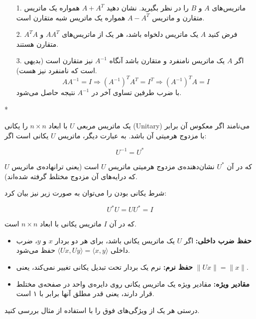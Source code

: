 \begin{example}
	\begin{itemize}
		\item [1. ] 
		ماتریس‌های 
		$A$
		و 
		$B$
		را در نظر بگیرید. نشان دهید 
		$A+A^T$
		همواره یک ماتریس متقارن و ماتریس
			$A-A^T$
		همواره یک ماتریس شبه متقارن است.
		\item[2. ] 
		 فرض کنید 
		 $A$
		 یک ماتریس دلخواه باشد، هر یک از ماتریس‌های 
		 $AA^T$
		 و
		 $A^TA$
		 متقارن هستند.
		 \item [3. ]
		  اگر 
		  $A$
		  یک ماتریس نامنفرد و متقارن باشد آنگاه
		 $A^{-1}$
		  نیز متقارن است (بدیهی است که نامنفرد نیز هست).
		  \[ AA^{-1}=I \Longrightarrow (A^{-1})^TA^T=I^T\Longrightarrow(A^{-1})^TA=I \]
		  با ضرب طرفین تساوی آخر در 
		  $A^{-1}$
		  نتیجه حاصل می‌شود.
	\end{itemize}
\end{example}

*\begin{definition}
یک ماتریس مربعی \( U \) با ابعاد \( n \times n \) را یکانی (Unitary) می‌نامند اگر معکوس آن برابر با مزدوج هرمیتی آن باشد. به عبارت دیگر، ماتریس \( U \) یکانی است اگر:

\[
U^{-1} = U^*
\]

که در آن \( U^* \) نشان‌دهنده‌ی مزدوج هرمیتی ماتریس \( U \) است (یعنی ترانهاده‌ی ماتریس \( U \) که درایه‌های آن مزدوج مختلط گرفته شده‌اند). 

شرط یکانی بودن را می‌توان به صورت زیر نیز بیان کرد:

\[
U^* U = U U^* = I
\]

که در آن \( I \) ماتریس یکانی با ابعاد \( n \times n \) است.
\end{definition}

\begin{nokteh}
\begin{itemize}
	\item 
	\textbf{حفظ ضرب داخلی: }اگر \( U \) یک ماتریس یکانی باشد، برای هر دو بردار \( x \) و \( y \)، ضرب داخلی \( \langle Ux, Uy \rangle = \langle x, y \rangle \) حفظ می‌شود.
	\item 
\textbf{حفظ نرم: }نرم یک بردار تحت تبدیل یکانی تغییر نمی‌کند، یعنی \( \|Ux\| = \|x\| \).

\item 
\textbf{مقادیر ویژه: }مقادیر ویژه یک ماتریس یکانی روی دایره‌ی واحد در صفحه‌ی مختلط قرار دارند، یعنی قدر مطلق آنها برابر با ۱ است.
\end{itemize}
\end{nokteh}
\begin{exercise}
درستی هر یک از ویژگی‌های فوق را با استفاده از مثال بررسی کنید.
\end{exercise}

